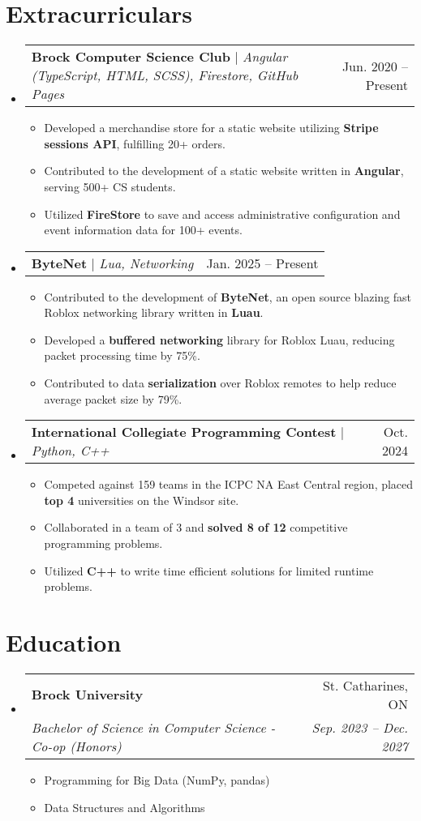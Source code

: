 \documentclass[letterpaper,11pt]{article}
\makeatletter
\newcommand{\resumeItem}[1]{
  \item\small{
    {#1 \vspace{-2pt}}
  }
}
\newcommand{\resumeSubheading}[4]{
  \vspace{-2pt}\item
    \begin{tabular*}{0.97\textwidth}[t]{l@{\extracolsep{\fill}}r}
      \textbf{#1} & #2 \\
      \textit{\small#3} & \textit{\small #4} \\
    \end{tabular*}\vspace{-7pt}
}
\newcommand{\resumeProjectHeading}[2]{
    \item
    \begin{tabular*}{0.97\textwidth}{l@{\extracolsep{\fill}}r}
      \small#1 & #2 \\
    \end{tabular*}\vspace{-7pt}
}
\newcommand{\resumeSubHeadingListStart}{\begin{itemize}[leftmargin=0.15in, label={}]}
\newcommand{\resumeSubHeadingListEnd}{\end{itemize}}
\newcommand{\resumeItemListStart}{\begin{itemize}}
\newcommand{\resumeItemListEnd}{\end{itemize}\vspace{-5pt}}
\makeatother
\begin{document}
\section{Extracurriculars}
    \resumeSubHeadingListStart
      \resumeProjectHeading
          {\textbf{Brock Computer Science Club} $|$ \emph{Angular (TypeScript, HTML, SCSS), Firestore, GitHub Pages}}{Jun. 2020 -- Present}
          \resumeItemListStart
            \resumeItem{Developed a merchandise store for a static website utilizing \textbf{Stripe sessions API}, fulfilling 20+ orders.}
            \resumeItem{Contributed to the development of a static website written in \textbf{Angular}, serving 500+ CS students.}
            \resumeItem{Utilized \textbf{FireStore} to save and access administrative configuration and event information data for 100+ events.}
          \resumeItemListEnd
      \resumeProjectHeading
        {\textbf{ByteNet} $|$ \emph{Lua, Networking}}{Jan. 2025 -- Present}
        \resumeItemListStart
          \resumeItem{Contributed to the development of \textbf{ByteNet}, an open source blazing fast Roblox networking library written in \textbf{Luau}.}
          \resumeItem{Developed a \textbf{buffered networking} library for Roblox Luau, reducing packet processing time by 75\%.}
          \resumeItem{Contributed to data \textbf{serialization} over Roblox remotes to help reduce average packet size by 79\%.}
        \resumeItemListEnd
      \resumeProjectHeading
          {\textbf{International Collegiate Programming Contest} $|$ \emph{Python, C++}}{Oct. 2024}
          \resumeItemListStart
            \resumeItem{Competed against 159 teams in the ICPC NA East Central region, placed \textbf{top 4} universities on the Windsor site.}
            \resumeItem{Collaborated in a team of 3 and \textbf{solved 8 of 12} competitive programming problems.}
            \resumeItem{Utilized \textbf{C++} to write time efficient solutions for limited runtime problems.}
          \resumeItemListEnd
    \resumeSubHeadingListEnd
%

\section{Education}
  \resumeSubHeadingListStart
    \resumeSubheading
      {Brock University}{St. Catharines, ON}
      {Bachelor of Science in Computer Science - Co-op (Honors)}{Sep. 2023 -- Dec. 2027}
    \resumeItemListStart
      \resumeItem{Programming for Big Data (NumPy, pandas)}
      \resumeItem{Data Structures and Algorithms}
    \resumeItemListEnd
  \resumeSubHeadingListEnd
%
\end{document}

